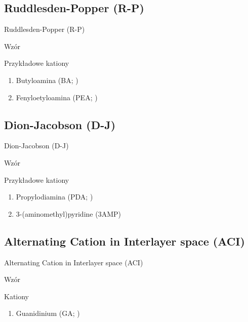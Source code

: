 \documentclass[xcolor]{beamer}
\begin{document}
\subsection{Ruddlesden-Popper (R-P)}
\begin{frame}{Ruddlesden-Popper (R-P)}
\begin{block}{Wzór}
\end{block}
\begin{block}{Przykładowe kationy}
\begin{enumerate}
\item Butyloamina (BA; )
\item Fenyloetyloamina (PEA; )
\end{enumerate}
\end{block}
\end{frame}

\subsection{Dion-Jacobson (D-J)}
\begin{frame}{Dion-Jacobson (D-J)}
\begin{block}{Wzór}
\end{block}
\begin{block}{Przykładowe kationy}
\begin{enumerate}
\item Propylodiamina (PDA; )
\item 3-(aminomethyl)pyridine (3AMP)
\end{enumerate}
\end{block}
\end{frame}

\subsection{Alternating Cation in Interlayer space (ACI)}
\begin{frame}{Alternating Cation in Interlayer space (ACI)}
\begin{block}{Wzór}
\end{block}
\begin{block}{Kationy}
\begin{enumerate}
\item Guanidinium (GA; )
\end{enumerate}
\end{block}
\end{frame}
\end{document}
